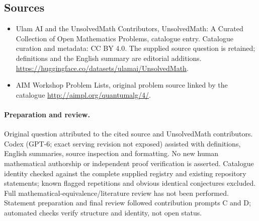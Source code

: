 \documentclass[11pt]{article}
\begin{document}
\subsection{Sources}
\begin{itemize}
\item[\hypertarget{source:statement:1}{S1}] Ulam AI and the UnsolvedMath Contributors, UnsolvedMath: A Curated Collection of Open Mathematics Problems, catalogue entry. Catalogue curation and metadata: CC BY 4.0. The supplied source question is retained; definitions and the English summary are editorial additions.
\url{https://huggingface.co/datasets/ulamai/UnsolvedMath}.
\item[\hypertarget{source:statement:2}{S2}] AIM Workshop Problem Lists, original problem source linked by the catalogue
\url{http://aimpl.org/quantumalg/4/}.
\end{itemize}
\paragraph{Preparation and review.}
Original question attributed to the cited source and UnsolvedMath contributors. Codex (GPT-6; exact serving revision not exposed) assisted with definitions, English summaries, source inspection and formatting. No new human mathematical authorship or independent proof verification is asserted. Catalogue identity checked against the complete supplied registry and existing repository statements; known flagged repetitions and obvious identical conjectures excluded. Full mathematical-equivalence/literature review has not been performed. Statement preparation and final review followed contribution prompts C and D; automated checks verify structure and identity, not open status.
\label{end:statement}
\end{document}
